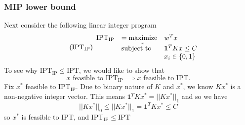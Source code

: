 \documentclass[12pt]{article}
\newcommand{\priv}{\text{IPT}}
\newcommand{\privlip}{\text{IPT}_\text{IP}}
\begin{document}
\subsubsection{\gls{MIP} lower bound}
Next consider the following linear integer program
\begin{equation}
	\label{eq:privlip} 
    \tag{$\privlip$} 
	\begin{array}{lll}
		\privlip & = \underset{x}{\text{maximize}} & w^T x \\
		&\mbox{subject to} & \mathbf{1}^TKx \leq C \\
        && x_i\in \{0,1\}
		\end{array}
\end{equation}
To see why $\privlip \leq \priv$, we would like to show that 
\[x \text{ feasible to } \privlip \implies x \text{ feasible to } \priv.\]
Fix $x^*$ feasible to $\privlip$. Due to binary nature of $K$ and $x^*$, we know $Kx^*$ is a non-negative integer vector. This means $\mathbf{1}^TKx^* = ||Kx^*||_1$ and so we have \[ ||Kx^*||_0 \leq ||Kx^*||_1 = \mathbf{1}^T K x^* \leq C\]
so $x^*$ is feasible to $\priv$, and $\privlip \leq \priv$
\end{document}
